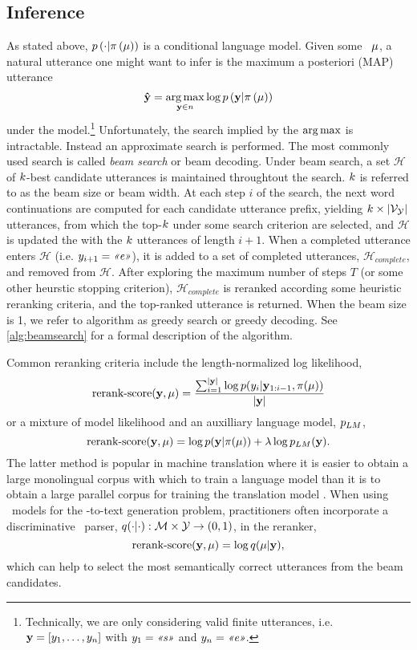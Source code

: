 


\subsection{Inference}

As stated above, $p\left(\cdot|\pi\left(\mu\right)\right)$ is a conditional language model.
Given some \meaningrepresentation~$\mu$, a natural utterance one might want to infer is the 
maximum a posteriori (MAP)
 utterance \[\boldsymbol{\hat{\mathbf{y}}} = \operatorname*{arg\,max}_{\mathbf{y}\in n} \log p\left(\mathbf{y}|\pi\left(\mu\right)\right) \] under the model.\footnote{Technically, we are only considering valid finite utterances, i.e. $\mathbf{y} = \left[y_1,\ldots,y_n\right]$ with $y_1 = \textit{<<s>>}$ and $y_n = \textit{<<e>>}$. } Unfortunately, the search implied by the $\operatorname*{arg\,max}$
is intractable. Instead an approximate search is performed. The most commonly used search
is called \textit{beam search} \citep{reddy1977} or beam decoding. 
Under beam search, a set $\mathcal{H}$ 
of $k$-best
candidate utterances is maintained throughtout the search. $k$ is referred
to as the beam size or beam width. At each step $i$ of the search,
the next word continuations are computed for each candidate utterance prefix, yielding $k \times \lvert\mathcal{V}_{\mathcal{Y}}\rvert$ utterances,
from which the top-$k$ under some search criterion are selected, and $\mathcal{H}$ is updated the with
the $k$ utterances of length $i+1$. 
When a completed utterance enters $\mathcal{H}$ (i.e. $y_{i+1} = \textit{<<e>>}$), it is added to a set of
completed utterances, $\mathcal{H}_{complete}$, and removed from $\mathcal{H}$.
After exploring the maximum number of steps $T$ (or some other heurstic
stopping criterion), $\mathcal{H}_{complete}$ is reranked according some heuristic 
reranking criteria, and the top-ranked  utterance is returned.
When the beam size
is 1, we refer to algorithm as greedy search or greedy decoding.
See \autoref{alg:beamsearch} for a formal description of the algorithm.

Common reranking criteria include the length-normalized log likelihood,
\[ \operatorname{rerank-score}(\mathbf{y},\mu) = \frac{\sum_{i=1}^{\left\vert \mathbf{y} \right\vert} \log p(y_i|\mathbf{y}_{1:i-1},\pi(\mu))}{{\left\vert \mathbf{y} \right\vert}}\]
or a mixture of model likelihood and an auxilliary  language model, $p_{LM}$,
\[ \operatorname{rerank-score}(\mathbf{y},\mu) = \log p(\mathbf{y}|\pi(\mu)) + \lambda \log p_{LM}(\mathbf{y}).\]
The latter method is popular in machine translation where it is easier
to obtain a large monolingual corpus with which to train a language model
than it is to obtain a large parallel corpus for training the translation model \cite{xie2017neural}. When using \sequencetosequence~models for the 
\meaningrepresentation-to-text generation problem, practitioners often incorporate
a discriminative \meaningrepresentation~parser, $q(\cdot|\cdot) : \mathcal{M} \times \mathcal{Y} \rightarrow (0,1)$,
in the reranker,
\[ \operatorname{rerank-score}(\mathbf{y},\mu) = \log q(\mu|\mathbf{y}),\]
which can help to select the most semantically correct utterances from the beam
candidates.
 

